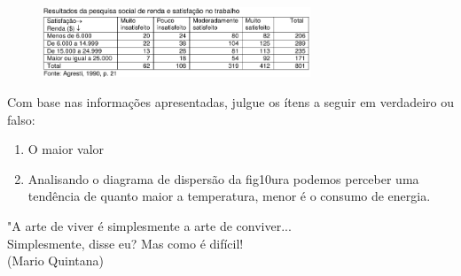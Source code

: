 \documentclass[twocolumn,oneside,a4paper,10pt]{article}
\begin{document}
\begin{enumerate}
\begin{figure}[!htb]
\center
\includegraphics[width=8cm]{Figuras/g15.png}
\end{figure}

Com base nas informações apresentadas, julgue os ítens a seguir em verdadeiro ou falso:
\begin{enumerate}
	\item O maior valor
	\item Analisando o diagrama de dispersão da fig10ura podemos perceber uma tendência de quanto maior a temperatura, menor é o consumo de energia.
\end{enumerate}

\end{enumerate}

\vspace{80pt}
\flushbottom
\flushright
"A arte de viver é simplesmente a arte de conviver...\\Simplesmente, disse eu? Mas como é difícil!\\(Mario Quintana)
\end{document}

